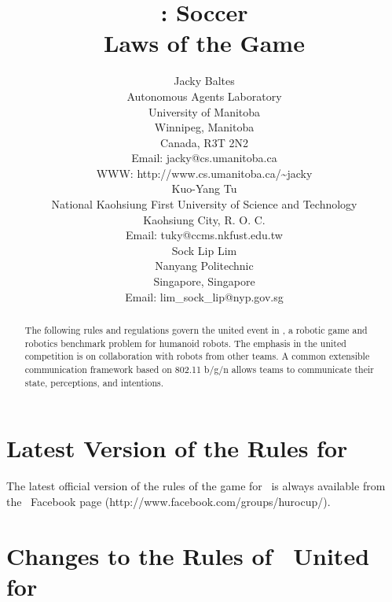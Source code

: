 \documentclass[12pt]{hurocup}
\begin{document}
\title{\HuroCup: Soccer\\
Laws of the Game \thisyear}

\author{Jacky Baltes\\
Autonomous Agents Laboratory\\
University of Manitoba\\
Winnipeg, Manitoba\\
Canada, R3T 2N2\\
Email: jacky@cs.umanitoba.ca\\
WWW: http://www.cs.umanitoba.ca/\~{ }jacky\\[5mm]
Kuo-Yang Tu\\
National Kaohsiung First University of Science and Technology\\
Kaohsiung City, R. O. C.\\
Email: tuky@ccms.nkfust.edu.tw\\[5mm]
Sock Lip Lim\\
Nanyang Politechnic\\
Singapore, Singapore\\
Email: lim\_sock\_lip@nyp.gov.sg 
}

\maketitle
\begin{abstract}
The following rules and regulations govern the united event in
\HuroCup, a robotic game and robotics benchmark problem for humanoid
robots. The emphasis in the united competition is on collaboration
with robots from other teams. A common extensible communication
framework based on 802.11 b/g/n allows teams to communicate their
state, perceptions, and intentions.
%
\end{abstract}

\section*{Latest Version of the Rules for \HuroCup}
\label{sec:updates}

The latest official version of the rules of the game for \HuroCup\ is
always available from the \HuroCup\ Facebook page
(http://www.facebook.com/groups/hurocup/).

\section*{Changes to the Rules of \HuroCup\ United for \thisyear}
\end{document}
